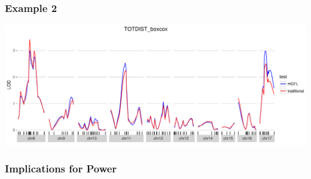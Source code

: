 \documentclass{beamer}
\begin{document}
\begin{frame}\frametitle{Example 2}
    \includegraphics[width=\textwidth]{TOTDIST_boxcox}
\end{frame}


\begin{frame}\frametitle{Implications for Power}


\end{frame}
\end{document}
